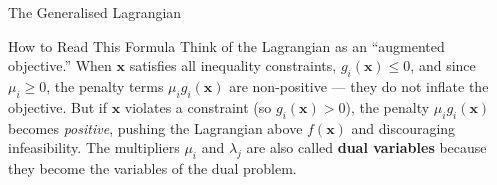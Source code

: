 \documentclass[aspectratio=169,10pt]{beamer}
\newcommand{\bx}{\mathbf{x}}
\begin{document}
\begin{frame}[allowframebreaks]{The Generalised Lagrangian}
  \begin{alertblock}{How to Read This Formula}
    Think of the Lagrangian as an ``augmented objective.''  When $\bx$
    satisfies all inequality constraints, $g_i(\bx) \le 0$, and since
    $\mu_i \ge 0$, the penalty terms $\mu_i g_i(\bx)$ are non-positive ---
    they do not inflate the objective.  But if $\bx$ violates a constraint
    (so $g_i(\bx) > 0$), the penalty $\mu_i g_i(\bx)$ becomes \emph{positive},
    pushing the Lagrangian above $f(\bx)$ and discouraging infeasibility.
    The multipliers $\mu_i$ and $\lambda_j$ are also called \textbf{dual
    variables} because they become the variables of the dual problem.
  \end{alertblock}

\end{frame}
\end{document}

